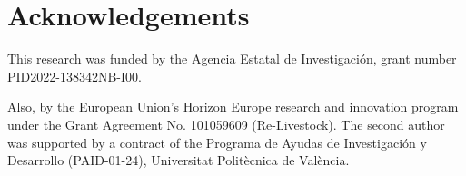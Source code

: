\documentclass[preprint,12pt]{elsarticle}
\begin{document}


%
\section*{Acknowledgements}
This research was funded by the Agencia Estatal de Investigaci\'on, grant number PID2022-138342NB-I00.

Also, by the European Union’s Horizon Europe research and innovation program under the Grant Agreement No. 
101059609 (Re-Livestock).
The second author was supported by a contract of the Programa de Ayudas de Investigación y Desarrollo (PAID-01-24), Universitat Politècnica de València.
\end{document}
